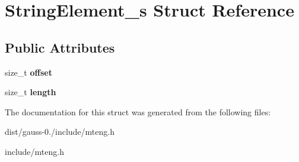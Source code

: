 \hypertarget{struct_string_element__s}{\section{String\-Element\-\_\-s Struct Reference}
\label{struct_string_element__s}
}
\subsection*{Public Attributes}
\begin{DoxyCompactItemize}
\item 
\hypertarget{struct_string_element__s_a6afa5e748df6cc96ebeab22c4c411a2a}{size\-\_\-t {\bfseries offset}}\label{struct_string_element__s_a6afa5e748df6cc96ebeab22c4c411a2a}

\item 
\hypertarget{struct_string_element__s_ae9d115f68b67b85435bf12bb3502ec0b}{size\-\_\-t {\bfseries length}}\label{struct_string_element__s_ae9d115f68b67b85435bf12bb3502ec0b}

\end{DoxyCompactItemize}


The documentation for this struct was generated from the following files\-:\begin{DoxyCompactItemize}
\item 
dist/gauss-\/0./include/mteng.\-h\item 
include/mteng.\-h\end{DoxyCompactItemize}
